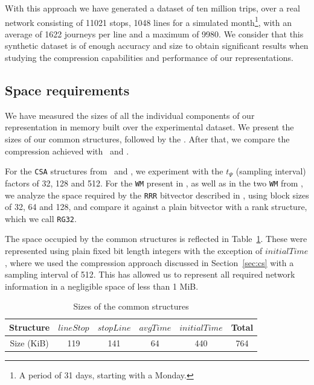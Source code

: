     With this approach we have generated a dataset of ten million trips, over a real network consisting of 11021 stops, 1048 lines for a simulated month\footnote{A period of 31 days, starting with a Monday.}, with an average of 1622 journeys per line and a maximum of 9980. We consider that this synthetic dataset is of enough accuracy and size to obtain significant results when studying the compression capabilities and performance of our representations.
    
    \subsection{Space requirements}
    \label{sec:space}
    We have measured the sizes of all the individual components of our representation in memory built over the experimental dataset. We present the sizes of our common structures, followed by the \acumm. After that, we compare the compression achieved with \ttctr~and \ctr.
    
    For the \texttt{CSA} structures from \ttctr~and \ctr, we experiment with the $t_\Psi$ (sampling interval) factors of 32, 128 and 512. For the \texttt{WM} present in \ttctr, as well as in the two \texttt{WM} from \ctr, we analyze the space required by the \texttt{RRR} bitvector described in \cite{Raman:2002:SID:545381.545411}, using block sizes of 32, 64 and 128, and compare it against a plain bitvector with a rank structure, which we call \texttt{RG32}.
    
    The space occupied by the common structures is reflected in Table~\ref{tab:commons}. These were represented using plain fixed bit length integers with the exception of $initialTime$, where we used the compression approach discussed in Section~\ref{sec:cs} with a sampling interval of 512. This has allowed us to represent all required network information in a negligible space of less than 1 MiB.
    
    \begin{table}
        \centering
        \caption{Sizes of the common structures}
        \label{tab:commons}
        \begin{tabular}{|c|c|c|c|c|c|}
        \hline
            Structure & $lineStop$ & $stopLine$ & $avgTime$ & $initialTime$ & Total \\
            \hline
            Size (KiB) & 119 & 141 & 64 & 440 & 764 \\
        \hline
        \end{tabular}
    \end{table}
    
